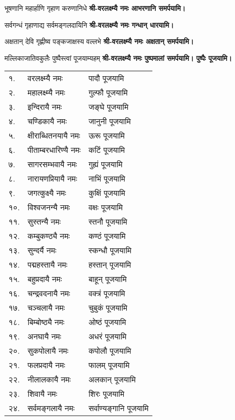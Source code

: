 \begin{center}
{भूषणानि महार्हाणि गृहाण करुणानिधे}
\textbf{श्री-वरलक्ष्म्यै नमः आभरणानि समर्पयामि।}
\medskip

{सर्वगन्धं गृहाणाद्य सर्वमङ्गलदायिनि}
\textbf{श्री-वरलक्ष्म्यै नमः गन्धान् धारयामि।}
\medskip

{अक्षतान् देवि गृह्णीष्व पङ्कजाक्षस्य वल्लभे}
\textbf{श्री-वरलक्ष्म्यै नमः अक्षतान् समर्पयामि।}
\medskip

{मल्लिकाजातिवकुलैः पुष्पैस्त्वां पूजयाम्यहम्}
\textbf{श्री-वरलक्ष्म्यै नमः पुष्पमालां समर्पयामि। पुष्पैः पूजयामि।}
\medskip

 
\end{center}


\begin{longtable}{ll@{— }l}
१. & वरलक्ष्म्यै नमः & पादौ पूजयामि\\
२. & महालक्ष्म्यै नमः & गुल्फौ पूजयामि\\
३. & इन्दिरायै नमः &  जङ्घे पूजयामि\\
४. & चण्डिकायै नमः & जानुनी पूजयामि\\
५. & क्षीराब्धितनयायै नमः & ऊरू  पूजयामि\\
६. & पीताम्बरधारिण्यै नमः & कटिं पूजयामि\\
७. & सागरसम्भवायै नमः & गुह्यं पूजयामि\\
८. & नारायणप्रियायै नमः & नाभिं पूजयामि\\
९. & जगत्कुक्ष्यै नमः & कुक्षिं पूजयामि\\
१०. & विश्वजनन्यै नमः & वक्षः पूजयामि\\
११. & सुस्तन्यै नमः & स्तनौ पूजयामि\\
१२. & कम्बुकण्ठ्यै नमः &  कण्ठं पूजयामि\\
१३. & सुन्दर्यै नमः & स्कन्धौ पूजयामि\\
१४. & पद्महस्तायै नमः & हस्तान् पूजयामि\\
१५. & बहुप्रदायै नमः & बाहून् पूजयामि\\
१६. & चन्द्रवदनायै नमः & वक्त्रं पूजयामि\\
१७. & चञ्चलायै नमः & चुबुकं पूजयामि\\
१८. & बिम्बोष्ठ्यै नमः & ओष्ठं पूजयामि\\
१९. & अनघायै नमः & अधरं पूजयामि\\
२०. & सुकपोलायै नमः & कपोलौ पूजयामि\\
२१. & फलप्रदायै नमः & फालम् पूजयामि\\
२२. & नीलालकायै नमः & अलकान् पूजयामि\\
२३. & शिवायै नमः & शिरः पूजयामि\\
२४. & सर्वमङ्गलायै नमः &  सर्वाण्यङ्गानि पूजयामि\\
\end{longtable}

